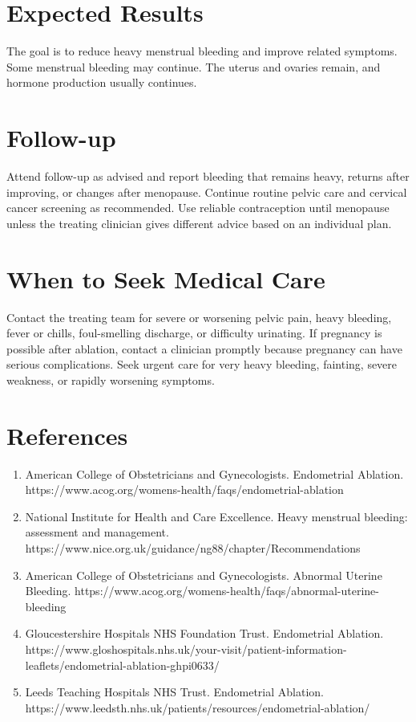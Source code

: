 \section*{Expected Results}
The goal is to reduce heavy menstrual bleeding and improve related symptoms. Some menstrual bleeding may continue. The uterus and ovaries remain, and hormone production usually continues.

\section*{Follow-up}
Attend follow-up as advised and report bleeding that remains heavy, returns after improving, or changes after menopause. Continue routine pelvic care and cervical cancer screening as recommended. Use reliable contraception until menopause unless the treating clinician gives different advice based on an individual plan.

\section*{When to Seek Medical Care}
Contact the treating team for severe or worsening pelvic pain, heavy bleeding, fever or chills, foul-smelling discharge, or difficulty urinating. If pregnancy is possible after ablation, contact a clinician promptly because pregnancy can have serious complications. Seek urgent care for very heavy bleeding, fainting, severe weakness, or rapidly worsening symptoms.

\section*{References}
\begin{enumerate}
  \item American College of Obstetricians and Gynecologists. Endometrial Ablation. https://www.acog.org/womens-health/faqs/endometrial-ablation
  \item National Institute for Health and Care Excellence. Heavy menstrual bleeding: assessment and management. https://www.nice.org.uk/guidance/ng88/chapter/Recommendations
  \item American College of Obstetricians and Gynecologists. Abnormal Uterine Bleeding. https://www.acog.org/womens-health/faqs/abnormal-uterine-bleeding
  \item Gloucestershire Hospitals NHS Foundation Trust. Endometrial Ablation. https://www.gloshospitals.nhs.uk/your-visit/patient-information-leaflets/endometrial-ablation-ghpi0633/
  \item Leeds Teaching Hospitals NHS Trust. Endometrial Ablation. https://www.leedsth.nhs.uk/patients/resources/endometrial-ablation/
\end{enumerate}

\clearpage
